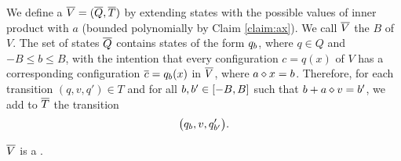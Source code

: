 We define a \geomvass $\overline{V} = (\overline{Q}, \overline{T})$ 
by extending states with the possible values of inner product with $a$
(bounded polynomially by Claim \ref{claim:ax}).
We call $\overline{V}$ the \emph{ {$B$}} of $V$. 
The set of states $\overline{Q}$ contains states of the form $q_{b}$, where $q\in Q$ and $-B \leq b \leq B$,
with the intention that every configuration
$c = q(x)$ of $V$ has a corresponding configuration 
$\overline{c} = q_{b} (x)$ in $\overline{V}$, 
where $a \diamond x = b$.
%
Therefore, for each transition $(q, v, q') \in T$
and for all $b, b'\in [-B, B]$
such that $b + a \diamond v = b'$,
we add to $\overline{T}$ the transition
\begin{align} \label{eq:tranV}
\big(q_{b}, v, q'_{b'}\big).
\end{align}

\begin{claim}\label{clm:trim_makes_geom}
$\overline{V}$ is a \geomvass.
\end{claim}

